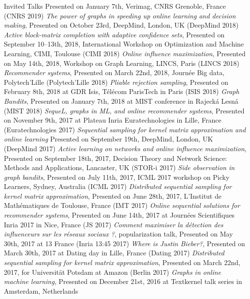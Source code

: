 \documentclass{resume}
\begin{document}
\begin{category}{Invited Talks}
Presented on January 7th, Verimag, CNRS Grenoble, France
({\sf CNRS  2019})
\citembullet
\emph{The power of graphs in speeding up online learning and decision making},
Presented on October 23rd, DeepMind, London, UK
({\sf DeepMind  2018})
\citembullet
\emph{Active block-matrix completion with adaptive confidence sets},  Presented on September 10--13th, 2018,  International Workshop  on Optimization and Machine Learning, CIMI, Toulouse ({\sf CIMI 2018})
\citembullet
\emph{Online influence maximization},  Presented on May 14th, 2018, Workshop on Graph Learning, LINCS, Paris ({\sf LINCS 2018})
\citembullet
\emph{Recommender systems},  Presented on March 22nd, 2018, Journ\' ee Big data, Polytech'Lille ({\sf Polytech'Lille 2018})
\citembullet
\emph{Pliable rejection sampling}, Presented on February 8th, 2018 at GDR Isis, T\' el\' ecom ParisTech in Paris ({\sf ISIS 2018})
\citembullet
\emph{Graph Bandits}, Presented on January 7th, 2018 at MIST conference in Rajeck\' a Lesn\' a ({\sf MIST 2018})
\citembullet
\emph{SequeL, graphs in ML, and online recommender systems}, Presented on November 9th, 2017 at Plateau Inria Euratechnologies in Lille, France  
({\sf Euratechnologies 2017})
\citembullet
\emph{Sequential sampling for kernel matrix approximation and online learning}
Presented on September 19th, DeepMind, London, UK
({\sf DeepMind  2017})
\citembullet
\emph{Active learning on networks and online influence maximization}, Presented on  September 18th, 2017, Decision Theory and Network Science: Methods and Applications, Lancaster, UK 
({\sf STOR-i  2017})
\citembullet
\emph{Side observation in graph bandits}, Presented on July 11th, 2017, ICML 2017 workshop on Picky Learners, Sydney, Australia ({\sf ICML 2017})
\citembullet
\emph{Distributed sequential sampling for kernel matrix approximation}, Presented on June 28th, 2017, L'Institut de Math\' ematiques de Toulouse, France
({\sf IMT 2017})
\citembullet
\emph{Online sequential solutions for recommender systems}, Presented on June 14th, 2017 at Journ\'ees Scientifiques Inria 2017 in Nice, France  
({\sf JS 2017})
\citembullet
\emph{Comment maximiser la d\'etection des influenceurs sur les r\'eseaux sociaux ?}, popularization talk, Presented on May 30th, 2017  at 13 France 
({\sf Inria 13:45 2017})
\citembullet
\emph{Where is Justin Bieber?}, Presented on March 30th, 2017  at Dating day  in Lille, France 
({\sf Dating 2017})
\citembullet
\emph{Distributed sequential sampling for kernel matrix approximation}, Presented on  March 22nd, 2017, for Universit\" at Potsdam at Amazon 
({\sf Berlin 2017})
\citembullet
\emph{Graphs in online machine learning}, Presented on December 21st, 2016 at Textkernel talk series in Amsterdam, Netherlands 

\end{category}
\end{document}
